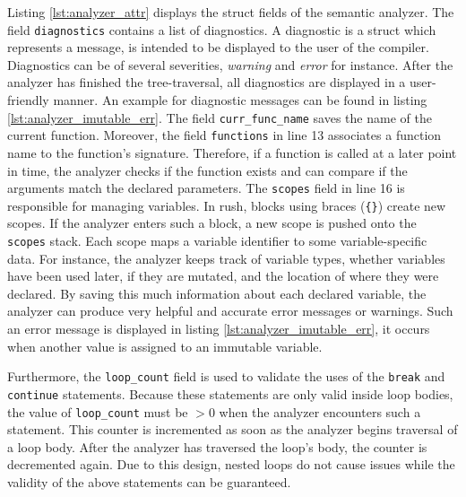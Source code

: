 Listing \ref{lst:analyzer_attr} displays the struct fields of the semantic analyzer.
The field \texttt{diagnostics} contains a list of diagnostics.
A diagnostic is a struct which represents a message, is intended to be displayed to the user of the compiler.
Diagnostics can be of several severities, \emph{warning} and \emph{error} for instance.
After the analyzer has finished the tree-traversal, all diagnostics are displayed in a user-friendly manner.
An example for diagnostic messages can be found in listing \ref{lst:analyzer_imutable_err}.
The field \texttt{curr\_func\_name} saves the name of the current function.
Moreover, the field \texttt{functions} in line 13 associates a function name to the function's signature.
Therefore, if a function is called at a later point in time, the analyzer checks if the function exists and can compare if the arguments match the declared parameters.
The \texttt{scopes} field in line 16 is responsible for managing variables.
In rush, blocks using braces (\texttt{\{\}}) create new scopes.
If the analyzer enters such a block, a new scope is pushed onto the \texttt{scopes} stack.
Each scope maps a variable identifier to some variable-specific data.
For instance, the analyzer keeps track of variable types, whether variables have been used later, if they are mutated, and the location of where they were declared.
By saving this much information about each declared variable, the analyzer can produce very helpful and accurate error messages or warnings.
Such an error message is displayed in listing \ref{lst:analyzer_imutable_err}, it occurs when another value is assigned to an immutable variable.


Furthermore, the \texttt{loop\_count} field is used to validate the uses of the \texttt{break} and \texttt{continue} statements.
Because these statements are only valid inside loop bodies, the value of \texttt{loop\_count} must be $> 0$ when the analyzer encounters such a statement.
This counter is incremented as soon as the analyzer begins traversal of a loop body.
After the analyzer has traversed the loop's body, the counter is decremented again.
Due to this design, nested loops do not cause issues while the validity of the above statements can be guaranteed.

